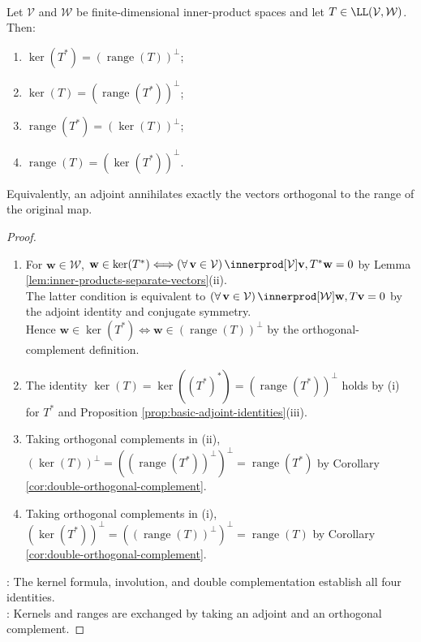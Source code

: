 \begin{proposition} \label{prop:adjoint-kernel-range-orthogonality} \\
Let $\mathcal{V}$ and $\mathcal{W}$ be finite-dimensional inner-product spaces and let $T\in\LL(\mathcal{V},\mathcal{W})$. Then:
\begin{enumerate}[label=(\roman*)]
\setlength{\itemsep}{0pt}
\item $\ker(T^*)=(\operatorname{range}(T))^{\perp}$;
\item $\ker(T)=(\operatorname{range}(T^*))^{\perp}$;
\item $\operatorname{range}(T^*)=(\ker(T))^{\perp}$;
\item $\operatorname{range}(T)=(\ker(T^*))^{\perp}$.
\end{enumerate}
Equivalently, an adjoint annihilates exactly the vectors orthogonal to the range of the original map.
\begin{proof}
\begin{enumerate}[label=(\roman*)]
\setlength{\itemsep}{0pt}
\item For $\mathbf{w}\in\mathcal{W}$, $\mathbf{w}\in\ker(T^*)\Longleftrightarrow(\forall\,\mathbf{v}\in\mathcal{V})\,\innerprod[\mathcal{V}]{\mathbf{v},T^*\mathbf{w}}=0$ by Lemma \ref{lem:inner-products-separate-vectors}(ii).\\
The latter condition is equivalent to $(\forall\,\mathbf{v}\in\mathcal{V})\,\innerprod[\mathcal{W}]{\mathbf{w},T\mathbf{v}}=0$ by the adjoint identity and conjugate symmetry.\\
Hence $\mathbf{w}\in\ker(T^*)\Longleftrightarrow\mathbf{w}\in(\operatorname{range}(T))^{\perp}$ by the orthogonal-complement definition.
\item The identity $\ker(T)=\ker((T^*)^*)=(\operatorname{range}(T^*))^{\perp}$ holds by (i) for $T^*$ and Proposition \ref{prop:basic-adjoint-identities}(iii).
\item Taking orthogonal complements in (ii), $(\ker(T))^{\perp}=((\operatorname{range}(T^*))^{\perp})^{\perp}=\operatorname{range}(T^*)$ by Corollary \ref{cor:double-orthogonal-complement}.
\item Taking orthogonal complements in (i), $(\ker(T^*))^{\perp}=((\operatorname{range}(T))^{\perp})^{\perp}=\operatorname{range}(T)$ by Corollary \ref{cor:double-orthogonal-complement}.
\end{enumerate}
: The kernel formula, involution, and double complementation establish all four identities.\\
: Kernels and ranges are exchanged by taking an adjoint and an orthogonal complement.
\end{proof}
\end{proposition}

